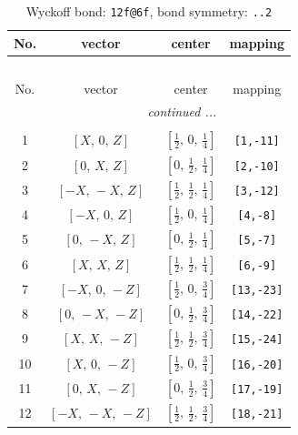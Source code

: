 \documentclass[fleqn,8pt]{jsarticle}
\begin{document}
\renewcommand{\arraystretch}{1.2}
\begin{longtable}{cccc}
\caption{Wyckoff bond: {\tt 12f@6f}, bond symmetry: {\tt ..2}}
 \\
 \hline \hline
No. & vector & center & mapping \\ \hline \endfirsthead

\multicolumn{3}{l}{\tablename\ \thetable{}} \\
 \hline \hline
No. & vector & center & mapping \\ \hline \endhead

 \hline \hline
\multicolumn{3}{r}{\footnotesize\it continued ...} \\ \endfoot

 \hline \hline
\multicolumn{3}{r}{} \\ \endlastfoot

1 & $\left[ X,\, 0,\, Z \right]$ & $\left[ \frac{1}{2},\, 0,\, \frac{1}{4} \right]$ & {\tt [1,-11]} \\ \hline
2 & $\left[ 0,\, X,\, Z \right]$ & $\left[ 0,\, \frac{1}{2},\, \frac{1}{4} \right]$ & {\tt [2,-10]} \\ \hline
3 & $\left[ - X,\, - X,\, Z \right]$ & $\left[ \frac{1}{2},\, \frac{1}{2},\, \frac{1}{4} \right]$ & {\tt [3,-12]} \\ \hline
4 & $\left[ - X,\, 0,\, Z \right]$ & $\left[ \frac{1}{2},\, 0,\, \frac{1}{4} \right]$ & {\tt [4,-8]} \\ \hline
5 & $\left[ 0,\, - X,\, Z \right]$ & $\left[ 0,\, \frac{1}{2},\, \frac{1}{4} \right]$ & {\tt [5,-7]} \\ \hline
6 & $\left[ X,\, X,\, Z \right]$ & $\left[ \frac{1}{2},\, \frac{1}{2},\, \frac{1}{4} \right]$ & {\tt [6,-9]} \\ \hline
7 & $\left[ - X,\, 0,\, - Z \right]$ & $\left[ \frac{1}{2},\, 0,\, \frac{3}{4} \right]$ & {\tt [13,-23]} \\ \hline
8 & $\left[ 0,\, - X,\, - Z \right]$ & $\left[ 0,\, \frac{1}{2},\, \frac{3}{4} \right]$ & {\tt [14,-22]} \\ \hline
9 & $\left[ X,\, X,\, - Z \right]$ & $\left[ \frac{1}{2},\, \frac{1}{2},\, \frac{3}{4} \right]$ & {\tt [15,-24]} \\ \hline
10 & $\left[ X,\, 0,\, - Z \right]$ & $\left[ \frac{1}{2},\, 0,\, \frac{3}{4} \right]$ & {\tt [16,-20]} \\ \hline
11 & $\left[ 0,\, X,\, - Z \right]$ & $\left[ 0,\, \frac{1}{2},\, \frac{3}{4} \right]$ & {\tt [17,-19]} \\ \hline
12 & $\left[ - X,\, - X,\, - Z \right]$ & $\left[ \frac{1}{2},\, \frac{1}{2},\, \frac{3}{4} \right]$ & {\tt [18,-21]} \\
\end{longtable}
\end{document}
